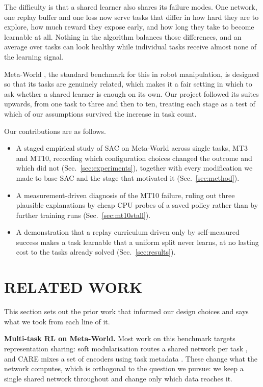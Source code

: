 \documentclass[letterpaper, 10 pt, conference]{ieeeconf}
\begin{document}
The difficulty is that a shared learner also shares its failure modes. One network, one
replay buffer and one loss now serve tasks that differ in how hard they are to explore, how
much reward they expose early, and how long they take to become learnable at all. Nothing in
the algorithm balances those differences, and an average over tasks can look healthy while
individual tasks receive almost none of the learning signal.

Meta-World \cite{yu2020metaworld}, the standard benchmark for this in robot manipulation,
is designed so that its tasks are genuinely related, which makes it a fair setting in which to
ask whether a shared learner is enough on its own. Our project followed its suites upwards,
from one task to three and then to ten, treating each stage as a test of which of our
assumptions survived the increase in task count.

Our contributions are as follows.

\begin{itemize}
\item A staged empirical study of SAC \cite{haarnoja2018sac} on Meta-World across single
      tasks, MT3 and MT10, recording which configuration choices changed the outcome and which
      did not (Sec.~\ref{sec:experiments}), together with every modification we made to base
      SAC and the stage that motivated it (Sec.~\ref{sec:method}).
\item A measurement-driven diagnosis of the MT10 failure, ruling out three plausible
      explanations by cheap CPU probes of a saved policy rather than by further training runs
      (Sec.~\ref{sec:mt10stall}).
\item A demonstration that a replay curriculum driven only by self-measured success makes
      a task learnable that a uniform split never learns, at no lasting cost to the tasks
      already solved (Sec.~\ref{sec:results}).
\end{itemize}

\section{RELATED WORK}

This section sets out the prior work that informed our design choices and says what we
took from each line of it.

\textbf{Multi-task RL on Meta-World.} Most work on this benchmark targets representation
sharing: soft modularisation routes a shared network per task \cite{yang2020softmod}, and
CARE mixes a set of encoders using task metadata \cite{sodhani2021care}. These change what
the network computes, which is orthogonal to the question we pursue: we keep a single
shared network throughout and change only which data reaches it.
\end{document}
